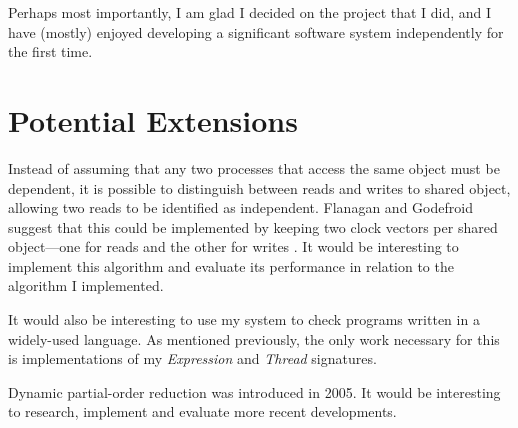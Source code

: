 \documentclass[12pt,a4paper,twoside,openright]{report}
\begin{document}
Perhaps most importantly,
I am glad I decided on the
project that I did, and
I have (mostly) enjoyed
developing a significant
software system independently
for the first time.

\section{Potential Extensions}
Instead of assuming that any
two processes that access the
same object must be dependent,
it is possible to distinguish
between reads and writes to
shared object, allowing
two reads to be identified
as independent.
Flanagan and Godefroid suggest
that this could be implemented
by keeping two clock vectors per
shared object---one for reads and
the other for writes \cite{flan05}.
It would
be interesting to implement
this algorithm and evaluate its
performance in relation to the
algorithm I implemented.

It would also be interesting
to use my system to check
programs written in a widely-used
language. As mentioned previously,
the only work necessary for this
is implementations of my
\textit{Expression} and
\textit{Thread} signatures.

Dynamic partial-order reduction
was introduced in 2005. It would
be interesting to research,
implement and evaluate more
recent developments.



\appendix
\end{document}

